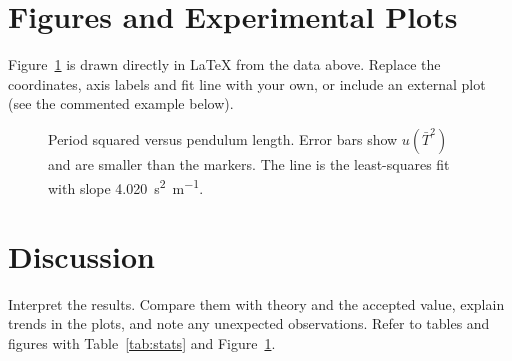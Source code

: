 \documentclass[12pt,a4paper]{article}
\newcommand{\ph}[1]{\textcolor{lpPlaceholder}{#1}}
\begin{document}
\section{Figures and Experimental Plots}
Figure~\ref{fig:fit} is drawn directly in \LaTeX{} from the data above. Replace the coordinates, axis labels and fit
line with your own, or include an external plot (see the commented example below).

\begin{figure}[H]
  \centering
  \caption{Period squared versus pendulum length. Error bars show $u(\bar{T}^{2})$ and are smaller than the markers.
           The line is the least-squares fit with slope \SI{4.020}{\second\squared\per\metre}.}
  \label{fig:fit}
\end{figure}


\section{Discussion}
\ph{Interpret the results. Compare them with theory and the accepted value, explain trends in the plots, and note any
unexpected observations. Refer to tables and figures with Table~\ref{tab:stats} and Figure~\ref{fig:fit}.}
\end{document}
